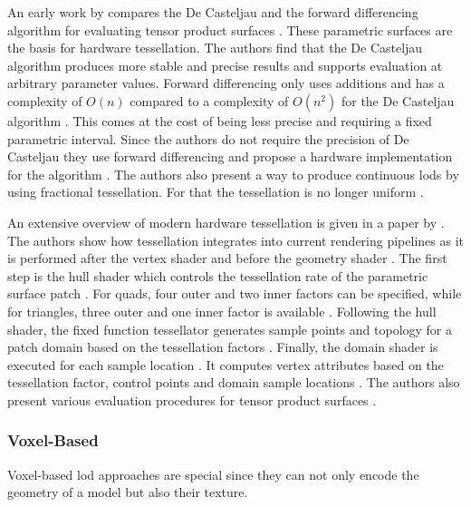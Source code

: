 An early work by \citeauthor{moreton_tessellation} compares the De Casteljau and the forward differencing algorithm for evaluating tensor product surfaces \cite{moreton_tessellation}.
These parametric surfaces are the basis for hardware tessellation.
The authors find that the De Casteljau algorithm produces more stable and precise results and supports evaluation at arbitrary parameter values.
Forward differencing only uses additions and has a complexity of $O(n)$ compared to a complexity of $O(n^2)$ for the De Casteljau algorithm \cite{moreton_tessellation}.
This comes at the cost of being less precise and requiring a fixed parametric interval.
Since the authors do not require the precision of De Casteljau they use forward differencing and propose a hardware implementation for the algorithm \cite{moreton_tessellation}.
The authors also present a way to produce continuous \acp{lod} by using fractional tessellation.
For that the tessellation is no longer uniform \cite{moreton_tessellation}.

An extensive overview of modern hardware tessellation is given in a paper by \citeauthor{niessner_tessellation} \cite{niessner_tessellation}.
The authors show how tessellation integrates into current rendering pipelines as it is performed after the vertex shader and before the geometry shader \cite{niessner_tessellation}.
The first step is the hull shader which controls the tessellation rate of the parametric surface patch \cite{niessner_tessellation}.
For quads, four outer and two inner factors can be specified, while for triangles, three outer and one inner factor is available \cite{niessner_tessellation}.
Following the hull shader, the fixed function tessellator generates sample points and topology for a patch domain based on the tessellation factors \cite{niessner_tessellation}.
Finally, the domain shader is executed for each sample location \cite{niessner_tessellation}.
It computes vertex attributes based on the tessellation factor, control points and domain sample locations \cite{niessner_tessellation}.
The authors also present various evaluation procedures for tensor product surfaces \cite{niessner_tessellation}.

\subsubsection*{Voxel-Based}
Voxel-based \ac{lod} approaches are special since they can not only encode the geometry of a model but also their texture.

